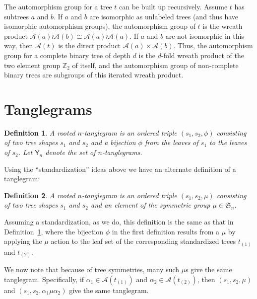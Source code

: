 \documentclass{amsart}
\newtheorem{definition}{Definition}
\newcommand{\ZZ}{\mathbb Z}
\newcommand{\fS}{\mathfrak S}
\newcommand{\aut}{\mathcal A}
\newcommand{\pairing}{\mu}
\newcommand{\tangle}{\mathsf{Y}}
\begin{document}
The automorphism group for a tree $t$ can be built up recursively.
Assume $t$ has subtrees $a$ and $b$.
If $a$ and $b$ are isomorphic as unlabeled trees (and thus have isomorphic automorphism groups), the automorphism group of $t$ is the wreath product $\aut(a) \wr \aut(b) \cong \aut(a) \wr \aut(a)$.
If $a$ and $b$ are not isomorphic in this way, then $\aut(t)$ is the direct product $\aut(a) \times \aut(b)$.
Thus, the automorphism group for a complete binary tree of depth $d$ is the $d$-fold wreath product of the two element group $\ZZ_2$ of itself, and the automorphism group of non-complete binary trees are subgroups of this iterated wreath product.


\section{Tanglegrams}


\begin{definition}
\label{def:abstractTanglegram}
A rooted $n$-\emph{tanglegram} is an ordered triple $(s_1, s_2, \phi)$ consisting of two tree shapes $s_1$ and $s_2$ and a bijection $\phi$ from the leaves of $s_1$ to the leaves of $s_2$.
Let $\tangle_n$ denote the set of $n$-tanglegrams.
\end{definition}

Using the ``standardization'' ideas above we have an alternate definition of a tanglegram:
\begin{definition}
\label{def:tanglegram}
A rooted $n$-\emph{tanglegram} is an ordered triple $(s_1, s_2, \pairing)$ consisting of two tree shapes $s_1$ and $s_2$ and an element of the symmetric group $\pairing \in \fS_n$.
\end{definition}
Assuming a standardization, as we do, this definition is the same as that in Definition~\ref{def:abstractTanglegram}, where the bijection $\phi$ in the first definition results from a $\pairing$ by applying the $\pairing$ action to the leaf set of the corresponding standardized trees $t_{(1)}$ and $t_{(2)}$.

We now note that because of tree symmetries, many such $\pairing$s give the same tanglegram.
Specifically, if $\alpha_1 \in \aut(t_{(1)})$ and $\alpha_2 \in \aut(t_{(2)})$, then $(s_1, s_2, \pairing)$ and $(s_1, s_2, \alpha_1 \pairing \alpha_2)$ give the same tanglegram.
\end{document}

